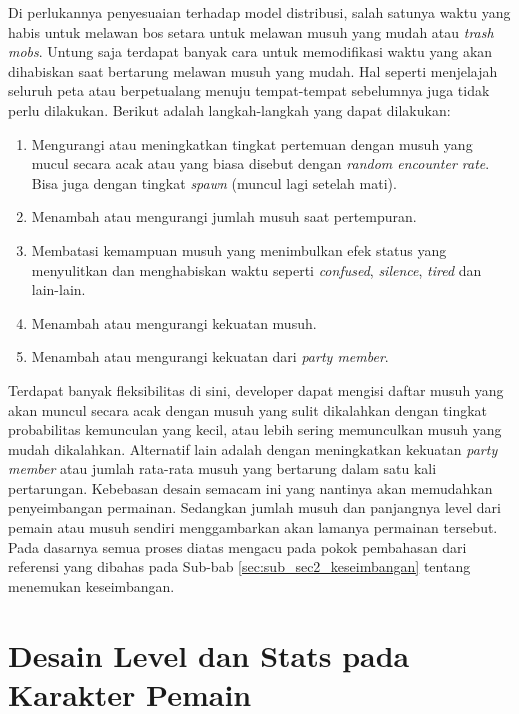 \begin{subs}
\begin{enumerate}[label=\textbf{\arabic*).}]
		Di perlukannya penyesuaian terhadap model distribusi, salah satunya waktu yang habis untuk melawan bos setara untuk melawan musuh yang mudah atau \textit{trash mobs}. Untung saja terdapat banyak cara untuk memodifikasi waktu yang akan dihabiskan saat bertarung melawan musuh yang mudah. Hal seperti menjelajah seluruh peta atau berpetualang menuju tempat-tempat sebelumnya juga tidak perlu dilakukan. Berikut adalah langkah-langkah yang dapat dilakukan:
	
		\begin{enumerate} [label=\alph*).]
			\item  Mengurangi atau meningkatkan tingkat pertemuan dengan musuh yang mucul secara acak atau yang biasa disebut dengan \textit{random encounter rate}. Bisa juga dengan tingkat \textit{spawn} (muncul lagi setelah mati).
			\item Menambah atau mengurangi jumlah musuh saat pertempuran.
			\item Membatasi kemampuan musuh yang menimbulkan efek status yang menyulitkan dan menghabiskan waktu seperti \textit{confused}, \textit{silence}, \textit{tired} dan lain-lain.
			\item Menambah atau mengurangi kekuatan musuh.
			\item Menambah atau mengurangi kekuatan dari \textit{party member}.
		\end{enumerate}
	\end{enumerate}
\end{subs}

Terdapat banyak fleksibilitas di sini, developer dapat mengisi daftar musuh yang akan muncul secara acak dengan musuh yang sulit dikalahkan dengan tingkat probabilitas kemunculan yang kecil, atau lebih sering memunculkan musuh yang mudah dikalahkan. Alternatif lain adalah dengan meningkatkan kekuatan \textit{party member} atau jumlah rata-rata musuh yang bertarung dalam satu kali pertarungan. Kebebasan desain semacam ini yang nantinya akan memudahkan penyeimbangan permainan. Sedangkan jumlah musuh dan panjangnya level dari pemain atau musuh sendiri menggambarkan akan lamanya permainan tersebut. Pada dasarnya semua proses diatas mengacu pada pokok pembahasan dari referensi yang dibahas pada Sub-bab \ref{sec:sub_sec2_keseimbangan} tentang menemukan keseimbangan.
\vspace{1ex}

\section{Desain Level dan Stats pada Karakter Pemain}
\label{sec:sec3_player_stats}
\vspace{1ex}

